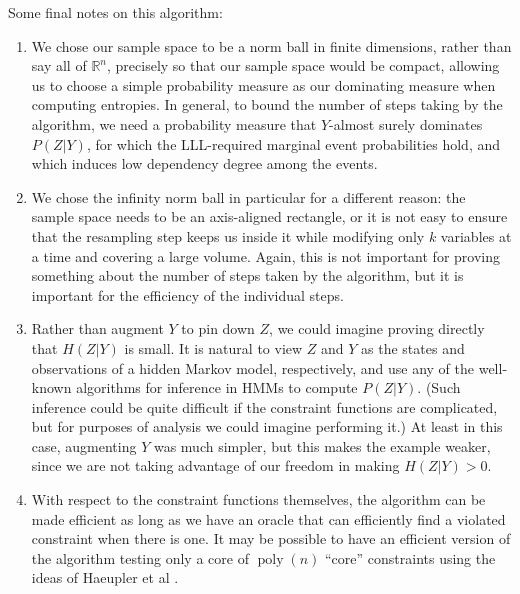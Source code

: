 \documentclass[twocolumn]{article}
\newcommand{\Reals}%
  {\mathbb{R}}
\begin{document}
Some final notes on this algorithm:
\begin{enumerate}
  \item We chose our sample space to be a norm ball in finite dimensions, rather than say all of $\Reals^n$, precisely so that our sample space would be compact, allowing us to choose a simple probability measure as our dominating measure when computing entropies.  In general, to bound the number of steps taking by the algorithm, we need a probability measure that $Y$-almost surely dominates $P(Z | Y)$, for which the LLL-required marginal event probabilities hold, and which induces low dependency degree among the events.
  \item We chose the infinity norm ball in particular for a different reason: the sample space needs to be an axis-aligned rectangle, or it is not easy to ensure that the resampling step keeps us inside it while modifying only $k$ variables at a time and covering a large volume.  Again, this is not important for proving something about the number of steps taken by the algorithm, but it is important for the efficiency of the individual steps.
  \item Rather than augment $Y$ to pin down $Z$, we could imagine proving directly that $H(Z | Y)$ is small.  It is natural to view $Z$ and $Y$ as the states and observations of a hidden Markov model, respectively, and use any of the well-known algorithms for inference in HMMs to compute $P(Z | Y)$.  (Such inference could be quite difficult if the constraint functions are complicated, but for purposes of analysis we could imagine performing it.)  At least in this case, augmenting $Y$ was much simpler, but this makes the example weaker, since we are not taking advantage of our freedom in making $H(Z | Y) > 0$.
  \item With respect to the constraint functions themselves, the algorithm can be made efficient as long as we have an oracle that can efficiently find a violated constraint when there is one.  It may be possible to have an efficient version of the algorithm testing only a core of $\operatorname{poly}(n)$ ``core'' constraints using the ideas of Haeupler et al \cite{haeupler2011new}.
\end{enumerate}

\end{document}

